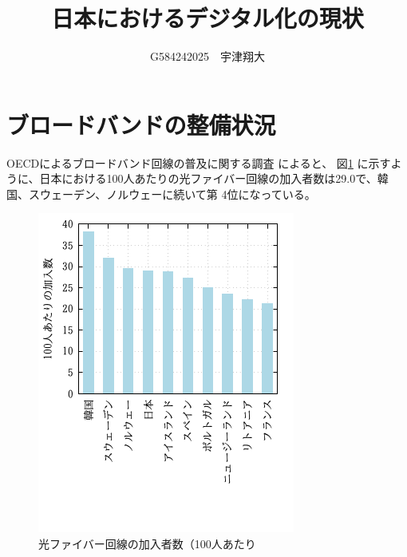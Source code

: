 \documentclass[a4paper,11pt,dvipdfmx]{ujarticle}
\title{日本におけるデジタル化の現状}
\author{G584242025　宇津翔大}
\begin{document}
\maketitle %

\section{ブロードバンドの整備状況}%

OECDによるブロードバンド回線の普及に関する調査%
\cite{oecd}によると、%
図\ref{fig:myfig}%
に示すように、日本における100人あたりの光ファイバー回線の加入者数は29.0で、韓国、スウェーデン、ノルウェーに続いて第
4位になっている。%

\begin{figure}[htbp]%
\centering%
\includegraphics{fig11.png}%
\caption{光ファイバー回線の加入者数（100人あたり}\label{fig:myfig}%
\end{figure}%
\end{document}
